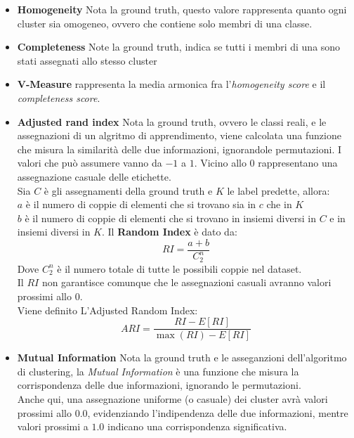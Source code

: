 \begin{itemize}
\item \textbf{Homogeneity}
Nota la ground truth, questo valore rappresenta quanto ogni cluster sia omogeneo, ovvero che contiene solo membri di una classe.
\item \textbf{Completeness}
Note la ground truth, indica se tutti i membri di una sono stati assegnati allo stesso cluster
\item \textbf{V-Measure} rappresenta la media armonica fra l'\textit{homogeneity score} e il \textit{completeness score}.

\item \textbf{Adjusted rand index}
Nota la ground truth, ovvero le classi reali, e le assegnazioni di un algritmo di apprendimento, viene calcolata una funzione che misura la similarità delle due informazioni, ignorandole permutazioni. I valori che può assumere vanno da $-1$ a $1$. Vicino allo $0$ rappresentano una assegnazione casuale delle etichette.
\\
Sia $C$ è gli assegnamenti della ground truth e $K$ le label predette, allora:
\\
$a$ è il numero di coppie di elementi che si trovano sia in $c$ che in $K$
\\
$b$ è il numero di coppie di elementi che si trovano in insiemi diversi in $C$ e in insiemi diversi in $K$.
Il \textbf{Random Index} è dato da:
\begin{equation}
RI = \frac{a + b}{C_2^n}
\end{equation}
Dove $C_2^n$ è il numero totale di tutte le possibili coppie nel dataset. 
\\
Il $RI$ non garantisce comunque che le assegnazioni casuali avranno valori prossimi allo $0$.
\\ Viene definito L'Adjusted Random Index:
\begin{equation}
ARI = \frac{RI - E[RI]}{\max (RI) - E[RI]}
\end{equation}
\item \textbf{Mutual Information}
Nota la ground truth e le asseganzioni dell'algoritmo di clustering, la \textit{Mutual Information} è una funzione che misura la corrispondenza delle due informazioni, ignorando le permutazioni. 
\\
Anche qui, una assegnazione uniforme (o casuale) dei cluster avrà valori prossimi allo $0.0$, evidenziando l'indipendenza delle due informazioni, mentre valori prossimi a $1.0$ indicano una corrispondenza significativa.


\end{itemize}


